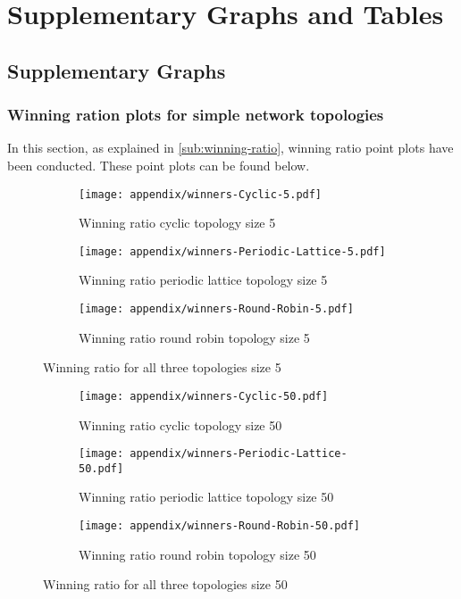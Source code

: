 \chapter{Supplementary Graphs and Tables}
\section{Supplementary Graphs}
\subsection{Winning ration plots for simple network topologies}
\label{append:wining-ratio-further-plot}
In this section, as explained in \autoref{sub:winning-ratio}, winning ratio point plots
have been conducted. These point plots can be found below.
\begin{figure}[H]
	\centering
	\begin{subfigure}[t]{0.75\textwidth}
		\centering
		\texttt{[image: appendix/winners-Cyclic-5.pdf]}
		\caption{Winning ratio cyclic topology size 5}
	\end{subfigure}
	\hfill
	\begin{subfigure}[t]{0.75\textwidth}\centering
		\centering
		\texttt{[image: appendix/winners-Periodic-Lattice-5.pdf]}
		\caption{Winning ratio periodic lattice topology size 5}
	\end{subfigure}
	\hfill
	\begin{subfigure}[t]{0.75\textwidth}\centering
		\centering
		\texttt{[image: appendix/winners-Round-Robin-5.pdf]}
		\caption{Winning ratio round robin topology size 5}
	\end{subfigure}
	\caption{Winning ratio for all three topologies size 5}
	\label{fig:winning-five}

\end{figure}

\begin{figure}[H]
	\centering
	\begin{subfigure}[t]{0.75\textwidth}
		\centering
		\texttt{[image: appendix/winners-Cyclic-50.pdf]}
		\caption{Winning ratio cyclic topology size 50}
	\end{subfigure}
	\hfill
	\begin{subfigure}[t]{0.75\textwidth}\centering
		\centering
		\texttt{[image: appendix/winners-Periodic-Lattice-50.pdf]}
		\caption{Winning ratio periodic lattice topology size 50}
	\end{subfigure}
	\hfill
	\begin{subfigure}[t]{0.75\textwidth}\centering
		\centering
		\texttt{[image: appendix/winners-Round-Robin-50.pdf]}
		\caption{Winning ratio round robin topology size 50}
	\end{subfigure}
	\caption{Winning ratio for all three topologies size 50}
	\label{fig:winning-fifty}
\end{figure}

